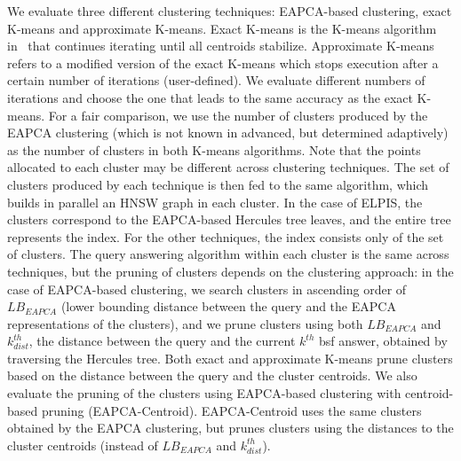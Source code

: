 We evaluate three different clustering techniques: EAPCA-based clustering, exact K-means and approximate K-means. 
Exact K-means is the K-means algorithm in~\cite{kmeanshistory} that continues iterating until all centroids stabilize. 
Approximate K-means refers to a modified version of the exact K-means which stops execution after a certain number of iterations (user-defined). 
We evaluate different numbers of iterations and choose the one that leads to the same accuracy as the exact K-means. 
For a fair comparison, we use the number of clusters produced by the EAPCA clustering (which is not known in advanced, but determined adaptively) as the number of clusters in both K-means algorithms. 
Note that the points allocated to each cluster may be different across clustering techniques. 
The set of clusters produced by each technique is then fed to the same algorithm, which builds in parallel an HNSW graph in each cluster. 
In the case of ELPIS, the clusters correspond to the EAPCA-based Hercules tree leaves, and the entire tree represents the index. 
For the other techniques, the index consists only of the set of clusters. 
The query answering algorithm within each cluster is the same across techniques, but the pruning of clusters depends on the clustering approach: in the case of EAPCA-based clustering, we search clusters in ascending order of $LB_{EAPCA}$ (lower bounding distance between the query and the EAPCA representations of the clusters), and we prune clusters using both $LB_{EAPCA}$ and $k^{th}_{dist}$, the distance between the query and the current $k^{th}$ bsf answer, obtained by traversing the Hercules tree. 
Both exact and approximate K-means prune clusters based on the distance between the query and the cluster centroids. 
We also evaluate the pruning of the clusters using EAPCA-based clustering with centroid-based pruning (EAPCA-Centroid). EAPCA-Centroid uses the same clusters obtained by the EAPCA clustering, but prunes clusters using the distances to the cluster centroids (instead of $LB_{EAPCA}$ and $k^{th}_{dist}$).


